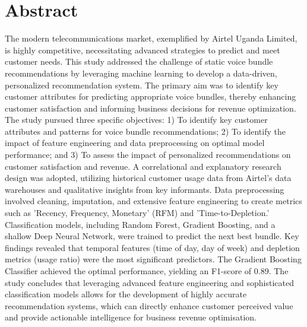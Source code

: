 \documentclass[12pt, a4paper]{report}
\begin{document}
\chapter*{Abstract}
The modern telecommunications market, exemplified by Airtel Uganda Limited, is highly competitive, necessitating advanced strategies to predict and meet customer needs. This study addressed the challenge of static voice bundle recommendations by leveraging machine learning to develop a data-driven, personalized recommendation system. The primary aim was to identify key customer attributes for predicting appropriate voice bundles, thereby enhancing customer satisfaction and informing business decisions for revenue optimization. The study pursued three specific objectives: 1) To identify key customer attributes and patterns for voice bundle recommendations; 2) To identify the impact of feature engineering and data preprocessing on optimal model performance; and 3) To assess the impact of personalized recommendations on customer satisfaction and revenue. A correlational and explanatory research design was adopted, utilizing historical customer usage data from Airtel's data warehouses and qualitative insights from key informants. Data preprocessing involved cleaning, imputation, and extensive feature engineering to create metrics such as 'Recency, Frequency, Monetary' (RFM) and 'Time-to-Depletion.' Classification models, including Random Forest, Gradient Boosting, and a shallow Deep Neural Network, were trained to predict the next best bundle. Key findings revealed that temporal features (time of day, day of week) and depletion metrics (usage ratio) were the most significant predictors. The Gradient Boosting Classifier achieved the optimal performance, yielding an F1-score of 0.89. The study concludes that leveraging advanced feature engineering and sophisticated classification models allows for the development of highly accurate recommendation systems, which can directly enhance customer perceived value and provide actionable intelligence for business revenue optimisation.

\clearpage

\tableofcontents
\clearpage

\listoffigures
\clearpage

\listoftables
\clearpage

\end{document}
